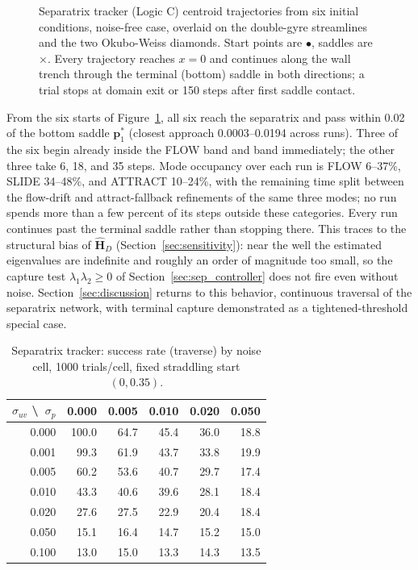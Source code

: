 \documentclass[12pt, letterpaper, oneside]{report}
\begin{document}
\begin{figure}[!t]
    \centering
    \framebox[0.9\linewidth]{\rule{0pt}{3.0cm}}
    \caption{Separatrix tracker (Logic C) centroid trajectories from six
    initial conditions, noise-free case, overlaid on the double-gyre
    streamlines and the two Okubo-Weiss diamonds. Start points are
    $\bullet$, saddles are $\times$. Every trajectory reaches $x = 0$ and
    continues along the wall trench through the terminal (bottom) saddle
    in both directions; a trial stops at domain exit or 150 steps after
    first saddle contact.}
    \label{fig:sep_trajectories}
\end{figure}

From the six starts of Figure~\ref{fig:sep_trajectories}, all six reach the
separatrix and pass within 0.02 of the bottom saddle
$\mathbf{p}^*_1$ (closest approach 0.0003--0.0194 across runs). Three of
the six begin already inside the FLOW band and band immediately;
the other three take 6, 18, and 35 steps. Mode occupancy over each run
is FLOW 6--37\%, SLIDE 34--48\%, and ATTRACT 10--24\%, with the
remaining time split between the flow-drift and attract-fallback
refinements of the same three modes; no run spends more than a few
percent of its steps outside these categories. Every run continues past
the terminal saddle rather than stopping there. This traces to the
structural bias of $\hat{\mathbf{H}}_D$ (Section~\ref{sec:sensitivity}):
near the well the estimated eigenvalues are indefinite and roughly an
order of magnitude too small, so the capture test
$\lambda_1\lambda_2 \geq 0$ of Section~\ref{sec:sep_controller} does not
fire even without noise. Section~\ref{sec:discussion} returns to this
behavior, continuous traversal of the separatrix network, with terminal
capture demonstrated as a tightened-threshold special case.

\begin{table}[!t]
\centering
\caption{Separatrix tracker: success rate (traverse) by noise cell,
1000 trials/cell, fixed straddling start $(0, 0.35)$.}
\label{tab:sep_success}
\footnotesize
\begin{tabular}{rrrrrr}
\toprule
$\sigma_{uv}$ \textbackslash\ $\sigma_p$ & 0.000 & 0.005 & 0.010 & 0.020 & 0.050 \\
\midrule
0.000 & 100.0 & 64.7 & 45.4 & 36.0 & 18.8 \\
0.001 &  99.3 & 61.9 & 43.7 & 33.8 & 19.9 \\
0.005 &  60.2 & 53.6 & 40.7 & 29.7 & 17.4 \\
0.010 &  43.3 & 40.6 & 39.6 & 28.1 & 18.4 \\
0.020 &  27.6 & 27.5 & 22.9 & 20.4 & 18.4 \\
0.050 &  15.1 & 16.4 & 14.7 & 15.2 & 15.0 \\
0.100 &  13.0 & 15.0 & 13.3 & 14.3 & 13.5 \\
\bottomrule
\end{tabular}
\end{table}
\end{document}
